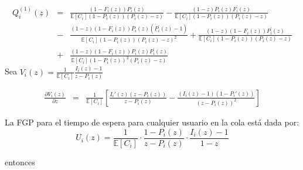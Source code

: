 \documentclass{article}
\newcommand{\esp}{\mathbb{E}}
\begin{document}
\begin{eqnarray*}
Q_{i}^{(1)}\left(z\right)&=& \frac{\left(1-F_{i}\left(z\right)\right)P_{i}\left(z\right)}{\esp\left[C_{i}\right]\left(1-P_{i}\left(z\right)\right)\left(P_{i}\left(z\right)-z\right)}
-\frac{\left(1-z\right)P_{i}\left(z\right)F_{i}^{'}\left(z\right)}{\esp\left[C_{i}\right]\left(1-P_{i}\left(z\right)\right)\left(P_{i}\left(z\right)-z\right)}\\
&-&\frac{\left(1-z\right)\left(1-F_{i}\left(z\right)\right)P_{i}\left(z\right)\left(P_{i}^{'}\left(z\right)-1\right)}{\esp\left[C_{i}\right]\left(1-P_{i}\left(z\right)\right)\left(P_{i}\left(z\right)-z\right)^{2}}+\frac{\left(1-z\right)\left(1-F_{i}\left(z\right)\right)P_{i}^{'}\left(z\right)}{\esp\left[C_{i}\right]\left(1-P_{i}\left(z\right)\right)\left(P_{i}\left(z\right)-z\right)}\\
&+&\frac{\left(1-z\right)\left(1-F_{i}\left(z\right)\right)P_{i}\left(z\right)P_{i}^{'}\left(z\right)}{\esp\left[C_{i}\right]\left(1-P_{i}\left(z\right)\right)^{2}\left(P_{i}\left(z\right)-z\right)}
\end{eqnarray*}
Sea
$V_{i}\left(z\right)=\frac{1}{\esp\left[C_{i}\right]}\frac{I_{i}\left(z\right)-1}{z-P_{i}\left(z\right)}$


\begin{eqnarray*}
\frac{\partial V_{i}\left(z\right)}{\partial z}&=&\frac{1}{\esp\left[C_{i}\right]}\left[\frac{I_{i}{'}\left(z\right)\left(z-P_{i}\left(z\right)\right)}{z-P_{i}\left(z\right)}-\frac{\left(I_{i}\left(z\right)-1\right)\left(1-P_{i}{'}\left(z\right)\right)}{\left(z-P_{i}\left(z\right)\right)^{2}}\right]
\end{eqnarray*}


La FGP para el tiempo de espera para cualquier usuario en la cola est\'a dada por:
\[U_{i}\left(z\right)=\frac{1}{\esp\left[C_{i}\right]}\cdot\frac{1-P_{i}\left(z\right)}{z-P_{i}\left(z\right)}\cdot\frac{I_{i}\left(z\right)-1}{1-z}\]

entonces
\end{document}
